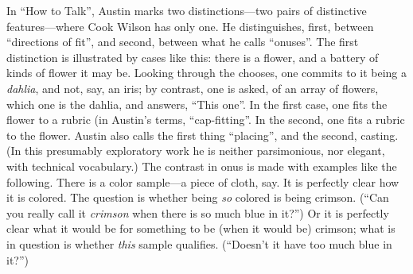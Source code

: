 In ``How to Talk'', Austin marks two distinctions---two pairs of distinctive features---where Cook Wilson has only one. He distinguishes, first, between ``directions of fit'', and second, between what he calls ``onuses''. The first distinction is illustrated by cases like this: there is a flower, and a battery of kinds of flower it may be. Looking through the chooses, one commits to it being a \emph{dahlia}, and not, say, an iris; by contrast, one is asked, of an array of flowers, which one is the dahlia, and answers, ``This one''. In the first case, one fits the flower to a rubric (in Austin’s terms, ``cap-fitting''. In the second, one fits a rubric to the flower. Austin also calls the first thing ``placing'', and the second, casting. (In this presumably exploratory work he is neither parsimonious, nor elegant, with technical vocabulary.) The contrast in onus is made with examples like the following. There is a color sample---a piece of cloth, say. It is perfectly clear how it is colored. The question is whether being \emph{so} colored is being crimson. (``Can you really call it \emph{crimson} when there is so much blue in it?'') Or it is perfectly clear what it would be for something to be (when it would be) crimson; what is in question is whether \emph{this} sample qualifies. (``Doesn’t it have too much blue in it?'')

